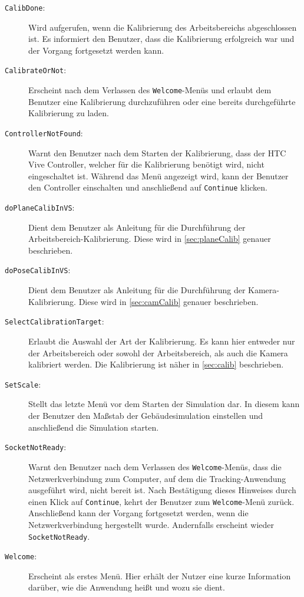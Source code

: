 \begin{description}
	\item[\texttt{CalibDone}:] Wird aufgerufen, wenn die Kalibrierung des Arbeitsbereichs abgeschlossen ist. Es informiert den Benutzer, dass die Kalibrierung erfolgreich war und der Vorgang fortgesetzt werden kann.
	\item[\texttt{CalibrateOrNot}:] Erscheint nach dem Verlassen des \texttt{Welcome}-Menüs und erlaubt dem Benutzer eine Kalibrierung durchzuführen oder eine bereits durchgeführte Kalibrierung zu laden.
	\item[\texttt{ControllerNotFound}:] Warnt den Benutzer nach dem Starten der Kalibrierung, dass der HTC Vive Controller, welcher für die Kalibrierung benötigt wird, nicht eingeschaltet ist. Während das Menü angezeigt wird, kann der Benutzer den Controller einschalten und anschließend auf \texttt{Continue} klicken.
	\item[\texttt{doPlaneCalibInVS}:] Dient dem Benutzer als Anleitung für die Durchführung der Arbeitsbereich-Kalibrierung. Diese wird in \ref{sec:planeCalib} genauer beschrieben.
	\item[\texttt{doPoseCalibInVS}:] Dient dem Benutzer als Anleitung für die Durchführung der Kamera-Kalibrierung. Diese wird in \ref{sec:camCalib} genauer beschrieben.
	\item[\texttt{SelectCalibrationTarget}:] Erlaubt die Auswahl der Art der Kalibrierung. Es kann hier entweder nur der Arbeitsbereich oder sowohl der Arbeitsbereich, als auch die Kamera kalibriert werden. Die Kalibrierung ist näher in \ref{sec:calib} beschrieben.
	\item[\texttt{SetScale}:] Stellt das letzte Menü vor dem Starten der Simulation dar. In diesem kann der Benutzer den Maßstab der Gebäudesimulation einstellen und anschließend die Simulation starten.
	\item[\texttt{SocketNotReady}:] Warnt den Benutzer nach dem Verlassen des \texttt{Welcome}-Menüs, dass die Netzwerkverbindung zum Computer, auf dem die Tracking-Anwendung ausgeführt wird, nicht bereit ist. Nach Bestätigung dieses Hinweises durch einen Klick auf \texttt{Continue}, kehrt der Benutzer zum \texttt{Welcome}-Menü zurück. Anschließend kann der Vorgang fortgesetzt werden, wenn die Netzwerkverbindung hergestellt wurde. Andernfalls erscheint wieder \texttt{SocketNotReady}.
	\item[\texttt{Welcome}:] Erscheint als erstes Menü. Hier erhält der Nutzer eine kurze Information darüber, wie die Anwendung heißt und wozu sie dient.
\end{description}

